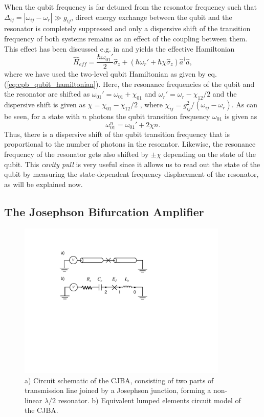 When the qubit frequency is far detuned from the resonator frequency such that $\Delta_{ij}=|\omega_{ij}-\omega_r| \gg g_{ij}$, direct energy exchange between the qubit and the resonator is completely suppressed and only a dispersive shift of the transition frequency of both systems remains as an effect of the coupling between them. This effect has been discussed e.g. in \cite{blais_cavity_2004,koch_charge-insensitive_2007} and yields the effective Hamiltonian
%
\begin{equation}
\hat{H}_{eff} = \frac{\hbar\omega_{01}'}{2}\hat{\sigma}_z+(\hbar\omega_r'+\hbar \chi \hat{\sigma}_z)\hat{a}^\dagger \hat{a}, \label{eq:dispersive_interaction}
\end{equation}
%
where we have used the two-level qubit Hamiltonian as given by eq. (\ref{eq:cpb_qubit_hamiltonian}). Here, the resonance frequencies of the qubit and the resonator are shifted as $\omega_{01}'=\omega_{01}+\chi_{01}$ and $\omega_r' = \omega_{r}-\chi_{12}/2$ and the dispersive shift is given as $\chi=\chi_{01}-\chi_{12}/2$ \citep{koch_charge-insensitive_2007}, where $\chi_{ij}=g_{ij}^2/(\omega_{ij}-\omega_r)$. As can be seen, for a state with $n$ photons the qubit transition frequency $\omega_{01}$ is given as
%
\begin{equation}
\omega_{01}^n = \omega_{01}'+2\chi n. \label{eq:stark_shift}
\end{equation}
%
Thus, there is a dispersive shift of the qubit transition frequency that is proportional to the number of photons in the resonator. Likewise, the resonance frequency of the resonator gets also shifted by $\pm\chi$ depending on the state of the qubit. This {\it cavity pull} is very useful since it allows us to read out the state of the qubit by measuring the state-dependent frequency displacement of the resonator, as will be explained now.

\subsection{The Josephson Bifurcation Amplifier} \label{section:cjba}

\begin{figure}
	\includegraphics[width=10cm]{"./material/figures/introduction/jba"}
	\caption{a) Circuit schematic of the CJBA, consisting of two parts of transmission line joined by a Josephson junction, forming a non-linear $\lambda/2$ resonator. b) Equivalent lumped elements circuit model of the CJBA.}
	\label{fig:cba_schematic}
\end{figure}

